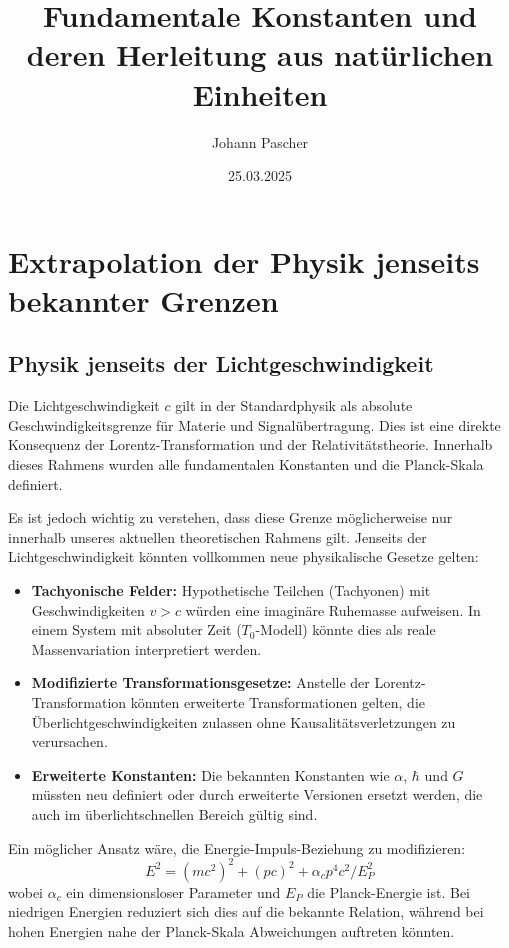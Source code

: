 \documentclass{article}
\title{Fundamentale Konstanten und deren Herleitung aus natürlichen Einheiten}
\author{Johann Pascher}
\date{25.03.2025}
\begin{document}
	
	\maketitle
	\tableofcontents
	
	\section{Extrapolation der Physik jenseits bekannter Grenzen}
	
	\subsection{Physik jenseits der Lichtgeschwindigkeit}
	
	Die Lichtgeschwindigkeit $c$ gilt in der Standardphysik als absolute Geschwindigkeitsgrenze für Materie und Signalübertragung. Dies ist eine direkte Konsequenz der Lorentz-Transformation und der Relativitätstheorie. Innerhalb dieses Rahmens wurden alle fundamentalen Konstanten und die Planck-Skala definiert.
	
	Es ist jedoch wichtig zu verstehen, dass diese Grenze möglicherweise nur innerhalb unseres aktuellen theoretischen Rahmens gilt. Jenseits der Lichtgeschwindigkeit könnten vollkommen neue physikalische Gesetze gelten:
	
	\begin{itemize}
		\item \textbf{Tachyonische Felder:} Hypothetische Teilchen (Tachyonen) mit Geschwindigkeiten $v > c$ würden eine imaginäre Ruhemasse aufweisen. In einem System mit absoluter Zeit ($T_0$-Modell) könnte dies als reale Massenvariation interpretiert werden.
		
		\item \textbf{Modifizierte Transformationsgesetze:} Anstelle der Lorentz-Transformation könnten erweiterte Transformationen gelten, die Überlichtgeschwindigkeiten zulassen ohne Kausalitätsverletzungen zu verursachen.
		
		\item \textbf{Erweiterte Konstanten:} Die bekannten Konstanten wie $\alpha$, $\hbar$ und $G$ müssten neu definiert oder durch erweiterte Versionen ersetzt werden, die auch im überlichtschnellen Bereich gültig sind.
	\end{itemize}
	
	Ein möglicher Ansatz wäre, die Energie-Impuls-Beziehung zu modifizieren:
	\begin{equation}
		E^2 = (mc^2)^2 + (pc)^2 + \alpha_c p^4 c^2 / E_P^2
	\end{equation}
	wobei $\alpha_c$ ein dimensionsloser Parameter und $E_P$ die Planck-Energie ist. Bei niedrigen Energien reduziert sich dies auf die bekannte Relation, während bei hohen Energien nahe der Planck-Skala Abweichungen auftreten könnten.
	
\end{document}
